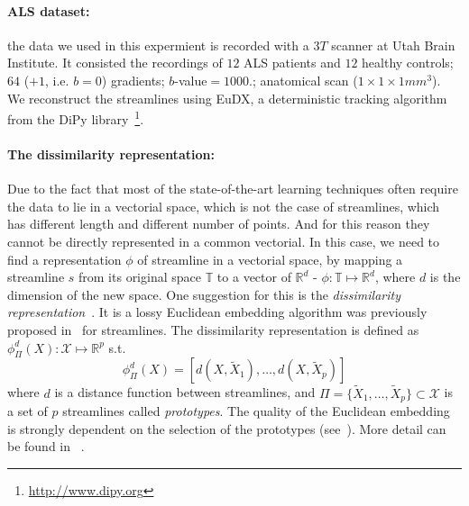 \paragraph*{ALS dataset:}
the data we used in this expermient is recorded with a $3T$ scanner at Utah Brain Institute. It
consisted the recordings of $12$ ALS patients and $12$ healthy
controls; $64$ ($+1$, i.e. $b=0$) gradients; $b$-value$=1000$.;
anatomical scan ($1 \times 1 \times 1mm^3$).  We reconstruct the
streamlines using EuDX, a deterministic tracking algorithm
~\cite{garyfallidis2012towards} from the DiPy
library~\footnote{\url{http://www.dipy.org}}. %
\paragraph*{The dissimilarity representation: }
Due to the fact that most of the state-of-the-art learning techniques often require the data to lie in a vectorial space, which is not the case of streamlines, which has different length and different number of points. And for this reason they cannot be directly represented in a common vectorial. In this case, we need to find a representation $\phi$ of streamline in a vectorial space, by mapping a streamline $s$ from its original space $\mathbb{T}$ to a vector of $\mathbb{R}^d$ - $\phi : \mathbb{T} \mapsto \mathbb{R}^d$, where $d$ is the dimension of the new space. One suggestion for this is the \emph{dissimilarity representation}~\cite{pekalska2002generalized}. It is a lossy Euclidean embedding algorithm was previously proposed
in~\cite{olivetti2012approximation} for streamlines. The dissimilarity representation
is defined as $\phi_{\Pi}^d(X):\mathcal{X} \mapsto \mathbb{R}^p$ s.t.
\begin{equation}
  \phi_{\Pi}^d(X) = [d(X,\tilde{X}_1) ,\ldots, d(X,\tilde{X}_p)]
\label{equ:dissimilarity_representation}
\end{equation}
where $d$ is a distance function between streamlines, and $\Pi =
\{\tilde{X}_1, \ldots, \tilde{X}_p\} \subset \mathcal{X}$ is a set of
$p$ streamlines called \emph{prototypes}. The quality of the Euclidean
embedding is strongly dependent on the selection of the prototypes
(see~\cite{pekalska2006prototype,olivetti2012approximation}). More detail can be found in ~\cite{olivetti2012approximation}.
